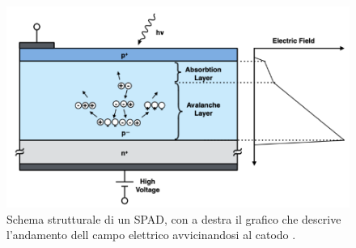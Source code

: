 \begin{figure}[h!]
    \centering
    \includegraphics[width=.75\linewidth]{img/ADP.png}
    \caption{Schema strutturale di un SPAD, con a destra il grafico che descrive l'andamento dell campo elettrico avvicinandosi al catodo \cite{linssen_2023_eurizon}.}
    \label{fig:adp}
\end{figure}

